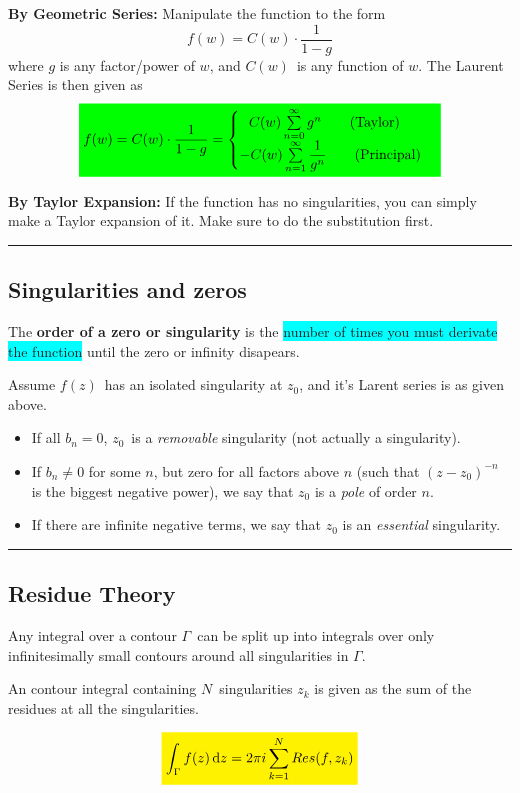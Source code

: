 \documentclass[10pt,a4paper]{article}
\newcommand{\holine}{\rule{286pt}{1pt}}
\newcommand{\yl}[1]{\colorbox{yellow}{$\displaystyle #1$}}
\newcommand{\gr}[1]{\colorbox{green}{$\displaystyle #1$}}
\newcommand{\bll}{\colorbox{cyan}}
\begin{document}
\begin{multicols}{2}
\textbf{By Geometric Series:} Manipulate the function to the form
\[
    f(w) = C(w)\cdot \frac{1}{1-g}
\]
    where $g$ is any factor/power of $w$, and $C(w)$ is any function of $w$.
    The Laurent Series is then given as
\[
\gr{
    f(w) = C(w)\cdot \frac{1}{1-g} = \begin{cases} \ \ C(w)\sum\limits_{n=0}^\infty g^n \quad\quad \text{(Taylor)} \\ -C(w)\sum\limits_{n=1}^\infty\dfrac{1}{g^n} \quad\quad \text{(Principal)} \end{cases}
}
\]

\textbf{By Taylor Expansion:} If the function has no singularities, you can simply make a Taylor expansion of it. Make sure to do the substitution first.


\holine
\subsection*{Singularities and zeros}
The \textbf{order of a zero or singularity} is the \bll{number of times you must derivate the function} until the zero or infinity disapears.

Assume $f(z)$ has an isolated singularity at $z_0$, and it's Larent series is as given above.
\begin{itemize}
    \item If all $b_n = 0$, $z_0$ is a \textit{removable} singularity (not actually a singularity).
    \item If $b_n \neq 0$ for some $n$, but zero for all factors above $n$ (such that $(z-z_0)^{-n}$ is the biggest negative power), we say that $z_0$ is a \textit{pole} of order $n$.
    \item If there are infinite negative terms, we say that $z_0$ is an \textit{essential} singularity.
\end{itemize}


\holine
\subsection*{Residue Theory}
Any integral over a contour $\Gamma$ can be split up into integrals over only infinitesimally small contours around all singularities in $\Gamma$.

An contour integral containing $N$ singularities $z_k$ is given as the sum of the residues at all the singularities.

\[\yl{
    \int_\Gamma f(z) \dd{z} = 2\pi i \sum_{k=1}^N Res(f,z_k)
}\]


\end{multicols}
\end{document}

